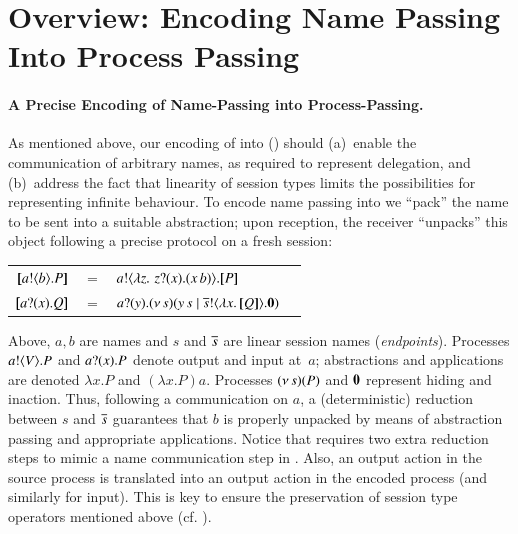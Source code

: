 \documentclass[runningheads]{llncs}
\begin{document}

\section{Overview: Encoding Name Passing Into Process Passing}
\label{sec:overview}
%
\paragraph{A Precise Encoding of Name-Passing into Process-Passing.}
As mentioned above, 
our encoding of \HOp into \HO () should 
(a)~enable the communication of arbitrary names, as required to represent delegation,
and 
(b)~address the fact that linearity of session types limits the 
possibilities for representing infinite behaviour. 
To encode name passing into \HO 
we ``pack''
the name to be sent into a suitable abstraction; 
upon reception, the receiver ``unpacks'' this object following a precise protocol on a fresh  session:
\begin{center}
\begin{tabular}{rcll}
  $[\!\![a ! \langle b \rangle . P]\!\!]$	&$=$&	$a ! \langle  \lambda z.\,\,z ? (x) . (x\, {b})  \rangle . [\!\![P]\!\!]$ \\
  $[\!\![a ? (x) . Q]\!\!]$	&$=$&	$a ? (y) . (\nu\, s)(y\, {s} \;|\; \overline{s} ! \langle \lambda x.\,[\!\![Q]\!\!] \rangle . \mathbf{0})$
\end{tabular}
\end{center}
Above, 
$a,b$ are names and $s$ and $\overline{s}$ are 
linear session names (\emph{endpoints}).
Processes $a ! \langle V \rangle . P$ and 
$a ? (x) . P$ denote output and input at~$a$;   
abstractions and applications are denoted
$\lambda x.P$ and $(\lambda x.P)a$. Processes %
$(\nu\, s)(P)$ and $\mathbf{0}$ represent hiding and inaction. %
Thus, following a communication on $a$, %
a (deterministic) reduction between  
$s$ and $\overline{s}$ guarantees that $b$ is properly unpacked by means of abstraction passing
and appropriate applications.
Notice that 
\HO requires two extra reduction steps to mimic a name communication step in \HOp.
Also, an output action in the source process is translated into an output action in the encoded process (and similarly for input).
This is key to ensure the preservation of session type operators mentioned above (cf. ).
\end{document}
